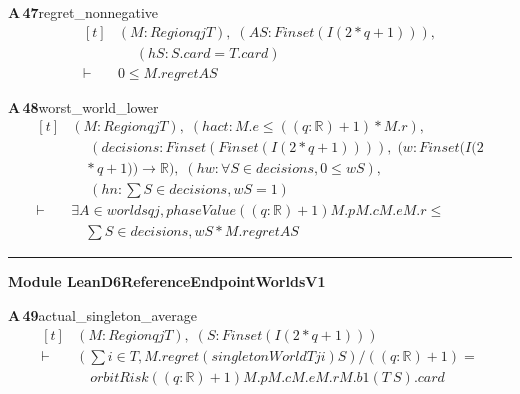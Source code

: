 \documentclass[conference]{IEEEtran}
\theoremstyle{definition}
\newcommand{\lean}[1]{\textsf{\footnotesize #1}}
\begin{document}
\noindent\textbf{A\,47}\quad\lean{regret\_nonnegative}
{\footnotesize\[ \begin{aligned}[t]
&(\mathit{M} : \mathit{Region} \mathit{q} \mathit{j} \mathit{T}),\; (\mathit{A} \mathit{S} : \mathit{Finset} (\mathit{I} (2*\mathit{q}+1))),\\
&\quad \; (\mathit{hS} : \mathit{S}.\mathit{card}=\mathit{T}.\mathit{card})\\
\vdash\;&0 \leq \mathit{M}.\mathit{regret} \mathit{A} \mathit{S}
\end{aligned} \]}

\noindent\textbf{A\,48}\quad\lean{worst\_world\_lower}
{\footnotesize\[ \begin{aligned}[t]
&(\mathit{M} : \mathit{Region} \mathit{q} \mathit{j} \mathit{T}),\; (\mathit{hact} : \mathit{M}.\mathit{e} \leq ((\mathit{q}:\mathbb{R} )+1)*\mathit{M}.\mathit{r}),\\
&\quad \; (\mathit{decisions} : \mathit{Finset} (\mathit{Finset} (\mathit{I} (2*\mathit{q}+1)))),\; (\mathit{w} : \mathit{Finset} (\mathit{I} (2\\
&\quad *\mathit{q}+1)) \to \mathbb{R} ),\; (\mathit{hw} : \forall \mathit{S} \in \mathit{decisions},0 \leq \mathit{w} \mathit{S}),\\
&\quad \; (\mathit{hn} : \textstyle\sum \mathit{S} \in \mathit{decisions},\mathit{w} \mathit{S}=1)\\
\vdash\;&\exists \mathit{A} \in \mathit{worlds} \mathit{q} \mathit{j},\mathit{phaseValue} ((\mathit{q}:\mathbb{R} )+1) \mathit{M}.\mathit{p} \mathit{M}.\mathit{c} \mathit{M}.\mathit{e} \mathit{M}.\mathit{r} \leq\\
&\quad \textstyle\sum \mathit{S} \in \mathit{decisions},\mathit{w} \mathit{S}*\mathit{M}.\mathit{regret} \mathit{A} \mathit{S}
\end{aligned} \]}

\vspace{4pt}\noindent\rule{\columnwidth}{0.4pt}\par\vspace{2pt}
\noindent\textbf{Module \lean{LeanD6ReferenceEndpointWorldsV1}}\par\vspace{3pt}

\noindent\textbf{A\,49}\quad\lean{actual\_singleton\_average}
{\footnotesize\[ \begin{aligned}[t]
&(\mathit{M} : \mathit{Region} \mathit{q} \mathit{j} \mathit{T}),\; (\mathit{S} : \mathit{Finset} (\mathit{I} (2*\mathit{q}+1)))\\
\vdash\;&(\textstyle\sum \mathit{i} \in \mathit{T},\mathit{M}.\mathit{regret} (\mathit{singletonWorld} \mathit{T} \mathit{j} \mathit{i}) \mathit{S})/((\mathit{q}:\mathbb{R} )+1) =\\
&\quad \mathit{orbitRisk} ((\mathit{q}:\mathbb{R} )+1) \mathit{M}.\mathit{p} \mathit{M}.\mathit{c} \mathit{M}.\mathit{e} \mathit{M}.\mathit{r} \mathit{M}.\mathit{b} 1 (\mathit{T} \ \mathit{S}).\mathit{card}
\end{aligned} \]}
\end{document}
